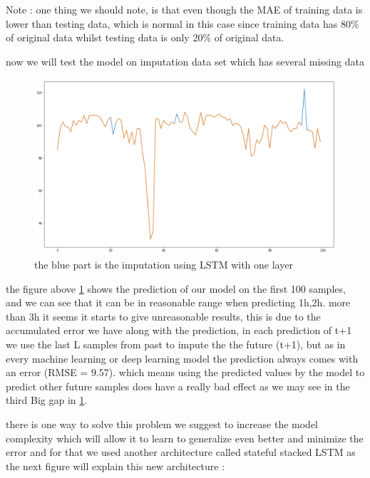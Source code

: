 Note : one thing we should note, is that even though the MAE of training data is lower than testing data, which is normal in this case  since training data has 80\%  of original data whilst testing data is only 20\% of original data.

now we will test the model on imputation data set which has  several missing data 

\begin{figure}[h]
\centering
\includegraphics[scale=.32]{img/merge_best_of_result.png}  
\caption{the blue part is the imputation using  LSTM with one layer}
\label{fig:first_imp}
\end{figure}

the figure above \ref{fig:first_imp} shows the prediction of our model on the first 100 samples, and we can see that it can be in reasonable range when predicting 1h,2h. more than 3h it seems it starts to give unreasonable results, this is due to the accumulated error we have along with the prediction, in each prediction of t+1 we use the last L samples from past to impute the the future (t+1), but as in every machine learning or deep learning model the prediction always comes with an error (RMSE = 9.57). which means using the predicted values by the model to predict other future samples does have a really bad effect as we may see in the third Big gap in \ref{fig:first_imp}.

there is one way to solve this problem we suggest to increase the model complexity which will allow it to learn to generalize even better and minimize the error and for that we used another architecture  called  stateful stacked LSTM as the next figure will explain this new architecture :

